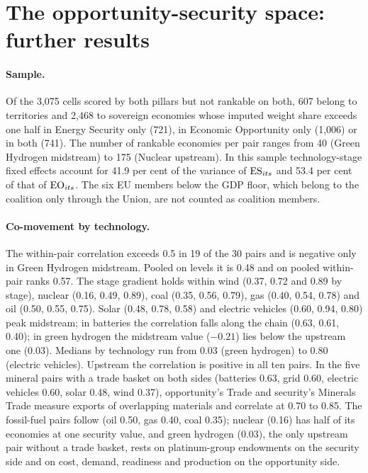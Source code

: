 \section{The opportunity-security space: further results}\label{oa:joint}

\paragraph{Sample.} Of the 3{,}075 cells scored by both pillars but not rankable on both, 607
belong to territories and 2{,}468 to sovereign economies whose imputed weight share exceeds one
half in Energy Security only (721), in Economic Opportunity only (1{,}006) or in both (741). The
number of rankable economies per pair ranges from 40 (Green Hydrogen midstream) to 175 (Nuclear
upstream). In this sample technology-stage fixed effects account for 41.9 per cent of the variance
of $\mathrm{ES}_{its}$ and 53.4 per cent of that of $\mathrm{EO}_{its}$. The six EU members below the GDP floor,
which belong to the coalition only through the Union, are not counted as coalition members.

\paragraph{Co-movement by technology.} The within-pair correlation exceeds 0.5 in 19 of the 30
pairs and is negative only in Green Hydrogen midstream. Pooled on levels it is 0.48 and on pooled
within-pair ranks 0.57. The stage gradient holds within wind (0.37, 0.72 and 0.89 by stage),
nuclear (0.16, 0.49, 0.89), coal (0.35, 0.56, 0.79), gas (0.40, 0.54, 0.78) and oil (0.50, 0.55,
0.75). Solar (0.48, 0.78, 0.58) and electric vehicles (0.60, 0.94, 0.80) peak midstream; in
batteries the correlation falls along the chain (0.63, 0.61, 0.40); in green hydrogen the midstream
value ($-0.21$) lies below the upstream one (0.03). Medians by technology run from 0.03 (green
hydrogen) to 0.80 (electric vehicles). Upstream the correlation is positive in all ten pairs. In the
five mineral pairs with a trade basket on both sides (batteries 0.63, grid 0.60, electric vehicles
0.60, solar 0.48, wind 0.37), opportunity's Trade and security's Minerals Trade measure exports of
overlapping materials and correlate at 0.70 to 0.85. The fossil-fuel pairs follow (oil 0.50, gas
0.40, coal 0.35); nuclear (0.16) has half of its economies at one security value, and green
hydrogen (0.03), the only upstream pair without a trade basket, rests on platinum-group endowments
on the security side and on cost, demand, readiness and production on the opportunity side.

